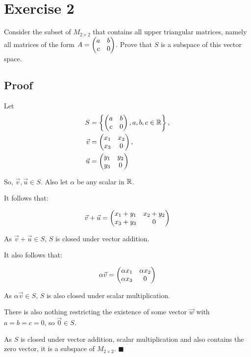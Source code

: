 \section*{Exercise 2}

Consider the subset of $M_{2 \times 2}$ that contains all upper triangular matrices, namely all matrices of the form $A =  \begin{pmatrix} a&b\\c&0 \end{pmatrix} $. Prove that $S$ is a subspace of this vector space.

\subsection*{Proof}

Let 
\[
	\begin{aligned}
		S &= \left\{  \begin{pmatrix} a&b\\c&0 \end{pmatrix} , a,b,c \in \mathbb{R} \right\}, \\ 
		\vec{v} &=  \begin{pmatrix} x_1 & x_2 \\ x_3 & 0 \end{pmatrix} , \\ 
		\vec{u} &=  \begin{pmatrix} y_1 & y_2 \\ y_3 & 0 \end{pmatrix} 
	\end{aligned}
\] 

So, $\vec{v}, \vec{u} \in S$. Also let $\alpha$ be any scalar in $\mathbb{R}$.

It follows that:

\[\vec{v} + \vec{u} =  \begin{pmatrix} x_1 + y_1 & x_2 + y_2 \\ x_3 + y_3 & 0 \end{pmatrix} \]

As $\vec{v} + \vec{u} \in S$, $S$ is closed under vector addition.

It also follows that:

\[\alpha \vec{v} =  \begin{pmatrix} \alpha x_1 & \alpha x_2 \\ \alpha x_3 & 0 \end{pmatrix} \]

As $\alpha \vec{v} \in S$, $S$ is also closed under scalar multiplication.

There is also nothing restricting the existence of some vector $\vec{w}$ with $a=b=c=0$, so $\vec{0} \in S$.

As $S$ is closed under vector addition, scalar multiplication and also contains the zero vector, it is a subspace of $M_{2 \times 2}$. $\blacksquare$

